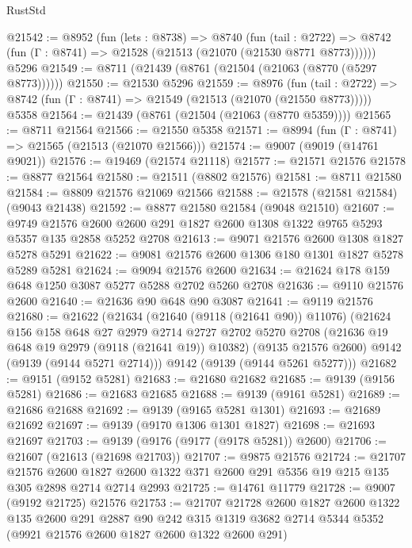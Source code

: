 \begin{lexlean}{RustStd}
\begin{coremodule}
@21542 := @8952
    (fun (lets : @8738) =>
    @8740
      (fun (tail : @2722) =>
      @8742 (fun (Γ : @8741) => @21528 (@21513 (@21070 (@21530 @8771 @8773))))))
    @5296
@21549 := @8711 (@21439 (@8761 (@21504 (@21063 (@8770 (@5297 @8773))))))
@21550 := @21530 @5296
@21559 := @8976
    (fun (tail : @2722) => @8742 (fun (Γ : @8741) => @21549 (@21513 (@21070 (@21550 @8773)))))
    @5358
@21564 := @21439 (@8761 (@21504 (@21063 (@8770 @5359))))
@21565 := @8711 @21564
@21566 := @21550 @5358
@21571 := @8994 (fun (Γ : @8741) => @21565 (@21513 (@21070 @21566)))
@21574 := @9007 (@9019 (@14761 @9021))
@21576 := @19469 (@21574 @21118)
@21577 := @21571 @21576
@21578 := @8877 @21564
@21580 := @21511 (@8802 @21576)
@21581 := @8711 @21580
@21584 := @8809 @21576 @21069 @21566
@21588 := @21578 (@21581 @21584) (@9043 @21438)
@21592 := @8877 @21580 @21584 (@9048 @21510)
@21607 := @9749
    @21576
    @2600
    @2600
    @291
    @1827
    @2600
    @1308
    @1322
    @9765
    @5293
    @5357
    @135
    @2858
    @5252
    @2708
@21613 := @9071 @21576 @2600 @1308 @1827 @5278 @5291
@21622 := @9081 @21576 @2600 @1306 @180 @1301 @1827 @5278 @5289 @5281
@21624 := @9094 @21576 @2600
@21634 := @21624 @178 @159 @648 @1250 @3087 @5277 @5288 @2702 @5260 @2708
@21636 := @9110 @21576 @2600
@21640 := @21636 @90 @648 @90 @3087
@21641 := @9119 @21576
@21680 := @21622
    (@21634
      (@21640 (@9118 (@21641 @90)) @11076)
      (@21624
        @156
        @158
        @648
        @27
        @2979
        @2714
        @2727
        @2702
        @5270
        @2708
        (@21636 @19 @648 @19 @2979 (@9118 (@21641 @19)) @10382)
        (@9135 @21576 @2600)
        @9142
        (@9139 (@9144 @5271 @2714)))
      @9142
      (@9139 (@9144 @5261 @5277)))
@21682 := @9151 (@9152 @5281)
@21683 := @21680 @21682
@21685 := @9139 (@9156 @5281)
@21686 := @21683 @21685
@21688 := @9139 (@9161 @5281)
@21689 := @21686 @21688
@21692 := @9139 (@9165 @5281 @1301)
@21693 := @21689 @21692
@21697 := @9139 (@9170 @1306 @1301 @1827)
@21698 := @21693 @21697
@21703 := @9139 (@9176 (@9177 (@9178 @5281)) @2600)
@21706 := @21607 (@21613 (@21698 @21703))
@21707 := @9875 @21576
@21724 := @21707
    @21576
    @2600
    @1827
    @2600
    @1322
    @371
    @2600
    @291
    @5356
    @19
    @215
    @135
    @305
    @2898
    @2714
    @2714
    @2993
@21725 := @14761 @11779
@21728 := @9007 (@9192 @21725) @21576
@21753 := @21707
    @21728
    @2600
    @1827
    @2600
    @1322
    @135
    @2600
    @291
    @2887
    @90
    @242
    @315
    @1319
    @3682
    @2714
    @5344
    @5352
    (@9921 @21576 @2600 @1827 @2600 @1322 @2600 @291)

\end{coremodule}
\end{lexlean}
